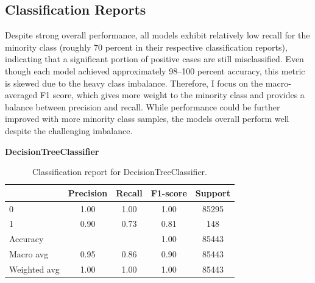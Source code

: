 \documentclass[12pt]{article}
\begin{document}
\begin{itemize}
\subsection{Classification Reports}

Despite strong overall performance, all models exhibit relatively low recall for the minority class (roughly 70 percent in their respective classification reports), indicating that a significant portion of positive cases are still misclassified. Even though each model achieved approximately 98–100 percent accuracy, this metric is skewed due to the heavy class imbalance. Therefore, I focus on the macro-averaged F1 score, which gives more weight to the minority class and provides a balance between precision and recall. While performance could be further improved with more minority class samples, the models overall perform well despite the challenging imbalance.

\textbf{DecisionTreeClassifier}
\begin{table}[h!]
\centering
\begin{tabular}{lcccc}
\hline
 & Precision & Recall & F1-score & Support \\
\hline
0 & 1.00 & 1.00 & 1.00 & 85295 \\
1 & 0.90 & 0.73 & 0.81 & 148 \\
\hline
Accuracy & & & 1.00 & 85443 \\
Macro avg & 0.95 & 0.86 & 0.90 & 85443 \\
Weighted avg & 1.00 & 1.00 & 1.00 & 85443 \\
\hline
\end{tabular}
\caption{Classification report for DecisionTreeClassifier.}
\end{table}
\FloatBarrier %


\end{itemize}
\end{document}
